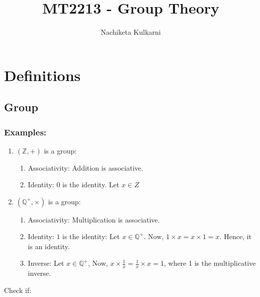 \documentclass[12pt, oneside]{book}
\date{}
\title{MT2213 - Group Theory}
\author{Nachiketa Kulkarni}
\begin{document}
\maketitle
\tableofcontents

\mainmatter
\chapter{Definitions}
\section{Group}

\subsection{Examples:}
\begin{enumerate}
    \item \( \left( \mathbb{Z}, +\right) \) is a group:
    \begin{enumerate}
        \item Associativity: Addition is associative.
        \item Identity: \(0\) is the identity. Let \(x \in Z\)
    \end{enumerate}
    \item \(\left( \mathbb{Q}^{+}, \times \right)\) is a group:
    \begin{enumerate}
        \item Associativity: Multiplication is associative.
        \item Identity: \(1\) is the identity:
        Let \(x \in \mathbb{Q}^{+} \). Now, \(1 \times x = x \times 1 = x\). Hence, it is an identity.
        \item Inverse: Let \(x \in \mathbb{Q}^{+} \), Now, \(x \times \frac{1}{x} = \frac{1}{x} \times x = 1\), where 1 is the multiplicative inverse.
    \end{enumerate}
\end{enumerate}
Check if:
\end{document}

